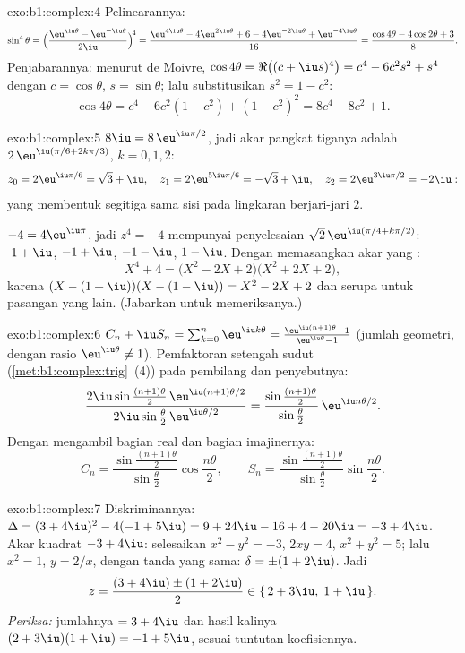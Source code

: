 \begin{solution}{exo:b1:complex:4}
Pelinearannya:
\[
\sin^4\theta
= \Bigl(\frac{\eu^{\iu\theta} - \eu^{-\iu\theta}}{2\iu}\Bigr)^{\!4}
= \frac{\eu^{4\iu\theta} - 4\eu^{2\iu\theta} + 6 - 4\eu^{-2\iu\theta}
+ \eu^{-4\iu\theta}}{16}
= \frac{\cos 4\theta - 4\cos 2\theta + 3}{8}.
\]
Penjabarannya: menurut de Moivre, $\cos 4\theta = \Re\bigl((c +
\iu s)^4\bigr) = c^4 - 6c^2 s^2 + s^4$ dengan $c = \cos\theta$, $s =
\sin\theta$; lalu substitusikan $s^2 = 1 - c^2$:
\[
\cos 4\theta = c^4 - 6c^2(1 - c^2) + (1 - c^2)^2
= 8c^4 - 8c^2 + 1 .
\]
\end{solution}

\begin{solution}{exo:b1:complex:5}
$8\iu = 8\,\eu^{\iu\pi/2}$, jadi akar pangkat tiganya adalah $2\,\eu^{\iu(\pi/6 +
2k\pi/3)}$, $k = 0, 1, 2$:
\[
z_0 = 2\eu^{\iu\pi/6} = \sqrt 3 + \iu,\quad
z_1 = 2\eu^{5\iu\pi/6} = -\sqrt 3 + \iu,\quad
z_2 = 2\eu^{3\iu\pi/2} = -2\iu :
\]
yang membentuk segitiga sama sisi pada lingkaran berjari-jari $2$.

$-4 = 4\eu^{\iu\pi}$, jadi $z^4 = -4$ mempunyai penyelesaian $\sqrt 2\,
\eu^{\iu(\pi/4 + k\pi/2)}$: $\;1 + \iu$, $-1 + \iu$, $-1 - \iu$,
$1 - \iu$. Dengan memasangkan akar yang :
\[
X^4 + 4 = \bigl(X^2 - 2X + 2\bigr)\bigl(X^2 + 2X + 2\bigr),
\]
karena $(X - (1+\iu))(X - (1-\iu)) = X^2 - 2X + 2$ dan serupa untuk
pasangan yang lain. (Jabarkan untuk memeriksanya.)
\end{solution}

\begin{solution}{exo:b1:complex:6}
$C_n + \iu S_n = \sum_{k=0}^{n} \eu^{\iu k\theta} =
\frac{\eu^{\iu(n+1)\theta} - 1}{\eu^{\iu\theta} - 1}$ (jumlah geometri,
dengan rasio $\eu^{\iu\theta} \neq 1$). Pemfaktoran setengah sudut
(\cref{met:b1:complex:trig}~(4)) pada pembilang dan penyebutnya:
\[
\frac{2\iu\sin\frac{(n+1)\theta}{2}\, \eu^{\iu(n+1)\theta/2}}
{2\iu\sin\frac{\theta}{2}\, \eu^{\iu\theta/2}}
= \frac{\sin\frac{(n+1)\theta}{2}}{\sin\frac{\theta}{2}}\,
\eu^{\iu n\theta/2}.
\]
Dengan mengambil bagian real dan bagian imajinernya:
\[
C_n = \frac{\sin\frac{(n+1)\theta}{2}}{\sin\frac{\theta}{2}}
\cos\frac{n\theta}{2},
\qquad
S_n = \frac{\sin\frac{(n+1)\theta}{2}}{\sin\frac{\theta}{2}}
\sin\frac{n\theta}{2}.
\]
\end{solution}

\begin{solution}{exo:b1:complex:7}
Diskriminannya: $\Delta = (3 + 4\iu)^2 - 4(-1 + 5\iu) = 9 + 24\iu - 16 +
4 - 20\iu = -3 + 4\iu$. Akar kuadrat $-3 + 4\iu$: selesaikan $x^2 - y^2
= -3$, $2xy = 4$, $x^2 + y^2 = 5$; lalu $x^2 = 1$, $y = 2/x$, dengan tanda
yang sama: $\delta = \pm(1 + 2\iu)$. Jadi
\[
z = \frac{(3 + 4\iu) \pm (1 + 2\iu)}{2}
\in \{\, 2 + 3\iu,\; 1 + \iu \,\}.
\]
\emph{Periksa:} jumlahnya $= 3 + 4\iu$ dan hasil kalinya $(2+3\iu)(1+\iu) = -1 +
5\iu$, sesuai tuntutan koefisiennya.
\end{solution}

